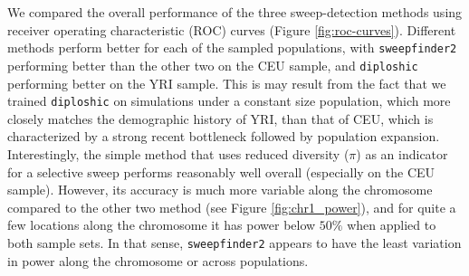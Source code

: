 \documentclass[hidelinks]{article}
\newcommand{\sweepfinder}{\texttt{sweepfinder2}\xspace}
\newcommand{\diploshic}{\texttt{diploshic}\xspace}
\newcommand{\drscomment}[1]{\textcolor{purple}{DRS: #1}}
\begin{document}
    We compared the overall performance of the three sweep-detection methods using
    receiver operating characteristic (ROC) curves (Figure \ref{fig:roc-curves}).
    Different methods perform better for each of the sampled populations,
    with \sweepfinder performing better than the other two on the CEU sample,
    and \diploshic performing better on the YRI sample.
    This is may result from the fact that we trained \diploshic on simulations under a constant size population,
    which more closely matches the demographic history of YRI, than that of CEU, which 
    is characterized by a strong recent bottleneck followed by population expansion.
    Interestingly, the simple method that uses reduced diversity ($\pi$) as an indicator
    for a selective sweep performs reasonably well overall (especially on the CEU sample).
    However, its accuracy is much more variable along the chromosome compared to the other two method (see Figure \ref{fig:chr1_power}),
    and for quite a few locations along the chromosome it has power below $50\%$
    when applied to both sample sets.
    In that sense, \sweepfinder appears to have the least variation in power along the chromosome or across populations.
\end{document}
